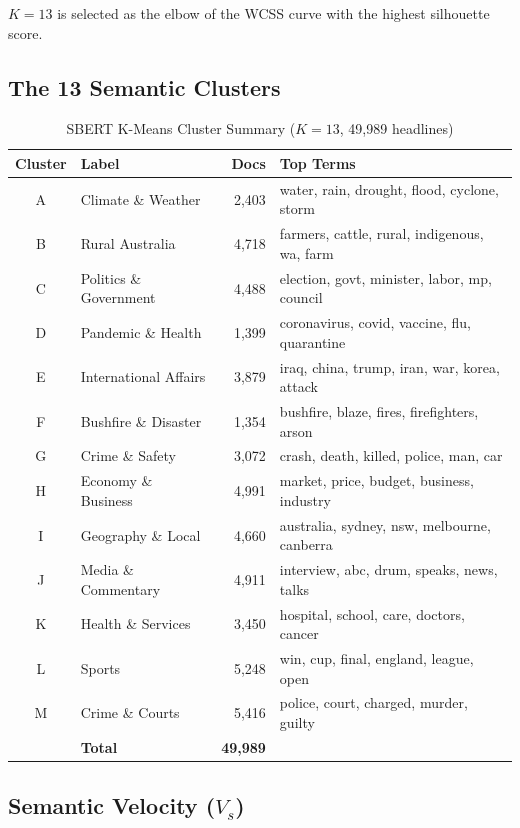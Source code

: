 \documentclass[12pt,a4paper]{article}
\begin{document}
\noindent $K{=}13$ is selected as the elbow of the WCSS curve with the highest silhouette score.

\subsection{The 13 Semantic Clusters}

\begin{table}[H]
\centering
\caption{SBERT K-Means Cluster Summary ($K{=}13$, 49,989 headlines)}
\begin{tabular}{clrp{7cm}}
\toprule
\textbf{Cluster} & \textbf{Label} & \textbf{Docs} & \textbf{Top Terms} \\
\midrule
A & Climate \& Weather     & 2,403  & water, rain, drought, flood, cyclone, storm \\
B & Rural Australia        & 4,718  & farmers, cattle, rural, indigenous, wa, farm \\
C & Politics \& Government & 4,488  & election, govt, minister, labor, mp, council \\
D & Pandemic \& Health     & 1,399  & coronavirus, covid, vaccine, flu, quarantine \\
E & International Affairs  & 3,879  & iraq, china, trump, iran, war, korea, attack \\
F & Bushfire \& Disaster   & 1,354  & bushfire, blaze, fires, firefighters, arson \\
G & Crime \& Safety        & 3,072  & crash, death, killed, police, man, car \\
H & Economy \& Business    & 4,991  & market, price, budget, business, industry \\
I & Geography \& Local     & 4,660  & australia, sydney, nsw, melbourne, canberra \\
J & Media \& Commentary    & 4,911  & interview, abc, drum, speaks, news, talks \\
K & Health \& Services     & 3,450  & hospital, school, care, doctors, cancer \\
L & Sports                 & 5,248  & win, cup, final, england, league, open \\
M & Crime \& Courts        & 5,416  & police, court, charged, murder, guilty \\
\midrule
  & \textbf{Total}         & \textbf{49,989} & \\
\bottomrule
\end{tabular}
\label{tab:clusters}
\end{table}

\subsection{Semantic Velocity ($V_s$)}
\end{document}
